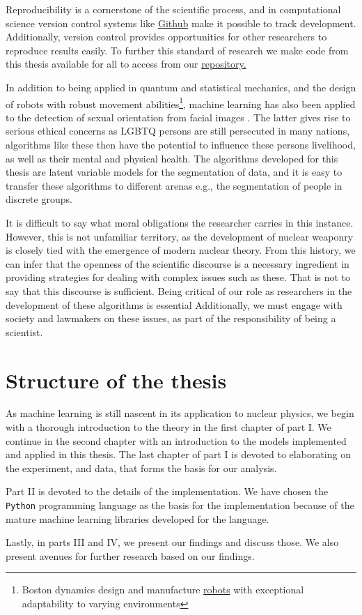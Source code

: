 Reproducibility is a cornerstone of the scientific process, and in computational science version control systems like \href{https://github.com/}{Github} make it possible to track development. Additionally, version control provides opportunities for other researchers to reproduce results easily. To further this standard of research we make code from this thesis available for all to access from our \href{https://github.com/ATTPC/VAE-event-classification}{repository.} 

In addition to being applied in quantum and statistical mechanics, and the design of robots with robust movement abilities\footnote{Boston dynamics design and manufacture \href{https://www.youtube.com/watch?v=LikxFZZO2sk}{robots} with exceptional adaptability to varying environments}, machine learning has also been applied to the detection of sexual orientation from facial images \cite{Wang2018}. The latter gives rise to serious ethical concerns as LGBTQ persons are still persecuted in many nations, algorithms like these then have the potential to influence these persons livelihood, as well as their mental and physical health. The algorithms developed for this thesis are latent variable models for the segmentation of data, and it is easy to transfer these algorithms to different arenas e.g., the segmentation of people in discrete groups.

It is difficult to say what moral obligations the researcher carries in this instance. However, this is not unfamiliar territory, as the development of nuclear weaponry is closely tied with the emergence of modern nuclear theory. From this history, we can infer that the openness of the scientific discourse is a necessary ingredient in providing strategies for dealing with complex issues such as these. That is not to say that this discourse is sufficient.  Being critical of our role as researchers in the development of these algorithms is essential Additionally, we must engage with society and lawmakers on these issues, as part of the responsibility of being a scientist. 

\section{Structure of the thesis}

As machine learning is still nascent in its application to nuclear physics, we begin with a thorough introduction to the theory in the first chapter of part I. We continue in the second chapter with an introduction to the models implemented and applied in this thesis. The last chapter of part I is devoted to elaborating on the experiment, and data, that forms the basis for our analysis.

Part II is devoted to the details of the implementation. We have chosen the \lstinline{Python} programming language as the basis for the implementation because of the mature machine learning libraries developed for the language. 

Lastly, in parts III and IV, we present our findings and discuss those. We also present avenues for further research based on our findings.

